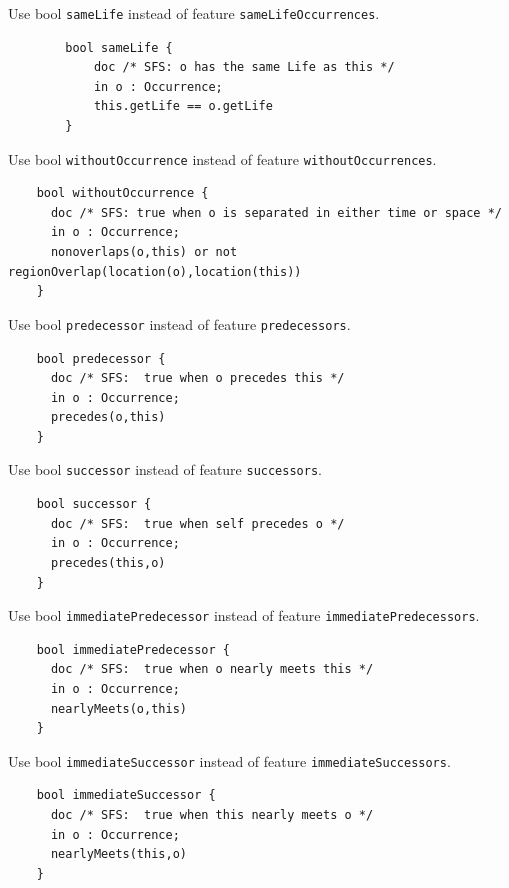 \pn Use bool \texttt{sameLife} instead of feature \texttt{sameLifeOccurrences}.

\begin{lstlisting}
		bool sameLife {
			doc /* SFS: o has the same Life as this */
			in o : Occurrence;
			this.getLife == o.getLife
		}
\end{lstlisting}

\pn Use bool \texttt{withoutOccurrence} instead of feature \texttt{withoutOccurrences}.

\begin{lstlisting}
    bool withoutOccurrence {
      doc /* SFS: true when o is separated in either time or space */
      in o : Occurrence;
      nonoverlaps(o,this) or not regionOverlap(location(o),location(this)) 
    }
\end{lstlisting}

\pn Use bool \texttt{predecessor} instead of feature \texttt{predecessors}.

\begin{lstlisting}
    bool predecessor {
      doc /* SFS:  true when o precedes this */
      in o : Occurrence;
      precedes(o,this)
    }
\end{lstlisting}

\pn Use bool \texttt{successor} instead of feature \texttt{successors}.

\begin{lstlisting}
    bool successor {
      doc /* SFS:  true when self precedes o */
      in o : Occurrence;
      precedes(this,o)
    }
\end{lstlisting}

\pn Use bool \texttt{immediatePredecessor} instead of feature \texttt{immediatePredecessors}.

\begin{lstlisting}
    bool immediatePredecessor {
      doc /* SFS:  true when o nearly meets this */
      in o : Occurrence;
      nearlyMeets(o,this)
    }
\end{lstlisting}

\pn Use bool \texttt{immediateSuccessor} instead of feature \texttt{immediateSuccessors}.

\begin{lstlisting}
    bool immediateSuccessor {
      doc /* SFS:  true when this nearly meets o */
      in o : Occurrence;
      nearlyMeets(this,o)
    }
\end{lstlisting}

